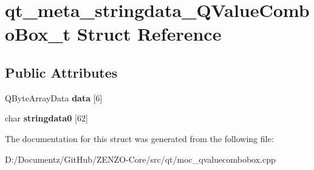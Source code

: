 \hypertarget{structqt__meta__stringdata___q_value_combo_box__t}{}\section{qt\+\_\+meta\+\_\+stringdata\+\_\+\+Q\+Value\+Combo\+Box\+\_\+t Struct Reference}
\label{structqt__meta__stringdata___q_value_combo_box__t}
\subsection*{Public Attributes}
\begin{DoxyCompactItemize}
\item 
\mbox{\label{structqt__meta__stringdata___q_value_combo_box__t_af8b4b9a747898e1244c6202212509037}} 
Q\+Byte\+Array\+Data {\bfseries data} \mbox{[}6\mbox{]}
\item 
\mbox{\label{structqt__meta__stringdata___q_value_combo_box__t_af08af822e0c3d3a4ae3079dd6fd3ea02}} 
char {\bfseries stringdata0} \mbox{[}62\mbox{]}
\end{DoxyCompactItemize}


The documentation for this struct was generated from the following file\+:\begin{DoxyCompactItemize}
\item 
D\+:/\+Documentz/\+Git\+Hub/\+Z\+E\+N\+Z\+O-\/\+Core/src/qt/moc\+\_\+qvaluecombobox.\+cpp\end{DoxyCompactItemize}
